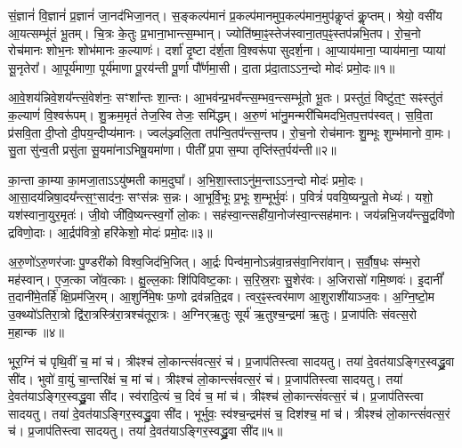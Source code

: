 \setcounter{anuvakam}{0}

   सं॒ज्ञानं॑ वि॒ज्ञानं॑ प्र॒ज्ञानं॑ जा॒नद॑भिजा॒नत्।
   स॒ङ्कल्प॑मानं प्र॒कल्प॑मानमुप॒\-कल्प॑मान॒मुप॑कॢप्तं कॢ॒प्तम्।
   श्रेयो॒ वसी॑य आ॒यत्सम्भू॑तं भू॒तम्।
   चि॒त्रः के॒तुः प्र॒भाना॒भान्त्स॒म्भान्।
   ज्योति॑ष्मा॒ꣴ॒स्तेज॑स्वाना॒तप॒ꣴ॒स्तप॑न्नभि॒\-तप\sn{}।
   रो॒च॒नो रोच॑मानः शोभ॒नः शोभ॑मानः क॒ल्याणः॑।
   दर्\mbox{}शा॑ दृ॒ष्टा द॑र्\mbox{}श॒ता वि॒श्वरू॑पा सुदर्\mbox{}श॒ना।
   आ॒प्याय॑माना॒ प्याय॑माना॒ प्याया॑ सू॒नृतेरा᳚।
   आ॒पूर्य॑माणा॒ पूर्य॑माणा पू॒रय॑न्ती पू॒र्णा पौ᳚र्णमा॒सी।
   दा॒ता प्र॑दा॒ताऽऽन॒न्दो मोदः॑ प्रमो॒दः॥१॥

   आ॒वे॒शय॑न्निवे॒शय᳚न्त्सं॒वेश॑नः॒ सꣳशा᳚न्तः शा॒न्तः।
   आ॒भव॑न्प्र॒\-भव᳚न्त्\-स॒म्भव॒न्त्सम्भू॑तो भू॒तः।
   प्रस्तु॑तं॒ विष्टु॑त॒ꣳ॒ सꣴस्तु॑तं क॒ल्याणं॑ वि॒श्वरू॑पम्।
   शु॒क्रम॒मृतं॑ तेज॒स्वि तेजः॒ समि॑द्धम्।
   अ॒रु॒णं भा॑नु॒मन्मरी॑चिमदभि॒तप॒त्तप॑स्वत्।
   स॒वि॒ता प्र॑सवि॒ता दी॒प्तो दी॒पय॒न्दीप्य॑मानः।
   ज्वल॑ञ्ज्वलि॒ता तप॑न्वि॒तप᳚न्त्स॒न्तप\sn{}।
   रो॒च॒नो रोच॑मानः शु॒म्भूः शुम्भ॑मानो वा॒मः।
   सु॒ता सु॑न्व॒ती प्रसु॑ता सू॒यमा॑नाऽभिषू॒यमा॑णा।
   पीती᳚ प्र॒पा स॒म्पा तृप्ति॑स्त॒र्पय॑न्ती॥२॥

   का॒न्ता का॒म्या का॒मजा॒ताऽऽयु॑ष्मती काम॒दुघा᳚।
   अ॒भि॒शा॒स्ताऽ\-नु॑म॒न्ताऽऽन॒न्दो मोदः॑ प्रमो॒दः।
   आ॒सा॒दय॑न्निषा॒\-दय᳚न्त्स॒ꣳ॒साद॑नः॒ सꣳस॑न्नः स॒न्नः।
   आ॒भूर्वि॒भूः प्र॒भूः श॒म्भूर्भुवः॑।
   प॒वित्रं॑ पवयि॒ष्यन्पू॒तो मेध्यः॑।
   यशो॒ यश॑स्वाना॒युर॒मृतः॑।
   जी॒वो जी॑वि॒ष्यन्त्स्व॒र्गो लो॒कः।
   सह॑स्वा॒न्त्सही॑या॒नोज॑स्वा॒न्त्सह॑मानः।
   जय॑न्नभि॒जय᳚न्त्सु॒\-द्रवि॑णो द्रविणो॒दाः।
   आ॒र्द्रप॑वित्रो॒ हरि॑केशो॒ मोदः॑ प्रमो॒दः॥३॥

   अ॒रु॒णो॑ऽरु॒णर॑जाः पु॒ण्डरी॑को विश्व॒जिद॑भि॒जित्।
   आ॒र्द्रः पिन्व॑मा॒नोऽन्न॑वा॒न्रस॑वा॒निरा॑वान्।
   स॒र्वौ॒ष॒धः स॑म्भ॒रो मह॑स्वान्।
   ए॒ज॒त्का जो॑व॒त्काः।
   क्षु॒ल्ल॒काः शि॑पिविष्ट॒काः।
   स॒रि॒स्र॒राः सु॒शेर॑वः।
   अ॒जिरासो॑ गमि॒ष्णवः॑।
   इ॒दानीं᳚ त॒दानी॑मे॒तर्\-\mbox{हि॑} क्षि॒प्रम॑जि॒रम्।
   आ॒शुर्नि॑मे॒षः फ॒णो द्रव॑न्नति॒द्रव।
   त्वर॒ꣴ॒स्त्वर॑माण आ॒शुराशी॑याञ्ज॒वः।
   अ॒ग्नि॒ष्टो॒म उ॒क्थ्यो॑ऽतिरा॒त्रो द्वि॑रा॒त्रस्त्रि॑रा॒त्रश्च॑तूरा॒त्रः।
   अ॒ग्निर्{‌}ऋ॒तुः सूर्य॑ ऋ॒तुश्च॒न्द्रमा॑ ऋ॒तुः।
   प्र॒जाप॑तिः संवत्स॒रो म॒हान्क॥४॥
   \anuvakamend
   
   भूर॒ग्निं च॑ पृथि॒वीं च॒ मां च॑।
   त्रीꣴश्च॑ लो॒कान्त्सं॑वत्स॒रं च॑।
   प्र॒जाप॑तिस्त्वा सादयतु।
   तया॑ दे॒वत॑याऽङ्गिर॒स्वद्ध्रु॒वा सी॑द।
   भुवो॑ वा॒युं चा॒न्तरि॑क्षं च॒ मां च॑।
   त्रीꣴश्च॑ लो॒कान्त्सं॑वत्स॒रं च॑।
   प्र॒जाप॑तिस्त्वा सादयतु।
   तया॑ दे॒वत॑याऽङ्गिर॒स्वद्ध्रु॒वा सी॑द।
   स्व॑रादि॒त्यं च॒ दिवं॑ च॒ मां च॑।
   त्रीꣴश्च॑ लो॒कान्त्सं॑वत्स॒रं च॑।
   प्र॒जाप॑तिस्त्वा सादयतु।
   तया॑ दे॒वत॑याऽङ्गिर॒स्वद्ध्रु॒वा सी॑द।
   भूर्भुवः॒ स्व॑श्च॒न्द्रम॑सं च॒ दिश॑श्च॒ मां च॑।
   त्रीꣴश्च॑ लो॒कान्त्सं॑वत्स॒रं च॑।
   प्र॒जाप॑तिस्त्वा सादयतु।
   तया॑ दे॒वत॑याऽङ्गिर॒स्वद्ध्रु॒वा सी॑द॥५॥
   \anuvakamend
   

